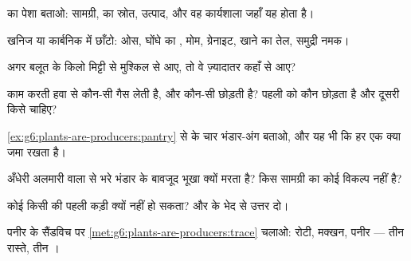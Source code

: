 \begin{exercise}[$\star$]\label{exo:g6:plants-are-producers:2}
 का पेशा बताओ: सामग्री,  का स्रोत, उत्पाद, और वह कार्यशाला
जहाँ यह होता है।
\end{exercise}

\begin{exercise}[$\star$]\label{exo:g6:plants-are-producers:3}
खनिज या कार्बनिक में छाँटो: ओस, घोंघे का , मोम, ग्रेनाइट, खाने का
तेल, समुद्री नमक।
\end{exercise}

\begin{exercise}[$\star$]\label{exo:g6:plants-are-producers:4}
अगर बलूत के किलो मिट्टी से मुश्किल से आए, तो वे ज़्यादातर कहाँ से आए?
\end{exercise}

\begin{exercise}[$\star$]\label{exo:g6:plants-are-producers:5}
काम करती  हवा से कौन-सी गैस लेती है, और कौन-सी छोड़ती है? पहली को
कौन छोड़ता है और दूसरी किसे चाहिए?
\end{exercise}

\begin{exercise}[$\star$]\label{exo:g6:plants-are-producers:6}
\cref{ex:g6:plants-are-producers:pantry} से  के चार भंडार-अंग बताओ,
और यह भी कि हर एक क्या जमा रखता है।
\end{exercise}

\begin{exercise}[$\star\star$]\label{exo:g6:plants-are-producers:7}
अँधेरी अलमारी वाला   से भरे भंडार के बावजूद भूखा क्यों
मरता है? किस सामग्री का कोई विकल्प नहीं है?
\end{exercise}

\begin{exercise}[$\star\star$]\label{exo:g6:plants-are-producers:8}
कोई  किसी  की पहली कड़ी क्यों नहीं हो सकता?
 और  के भेद से उत्तर दो।
\end{exercise}

\begin{exercise}[$\star\star$]\label{exo:g6:plants-are-producers:9}
पनीर के सैंडविच पर \cref{met:g6:plants-are-producers:trace} चलाओ: रोटी,
मक्खन, पनीर --- तीन रास्ते, तीन ।
\end{exercise}

